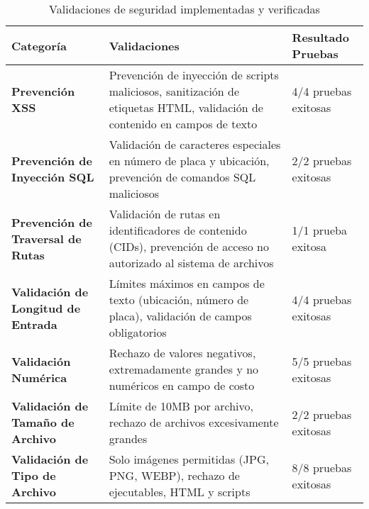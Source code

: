 \begin{table}[htbp]
\centering
\caption{Validaciones de seguridad implementadas y verificadas}
\begin{adjustbox}{max width=\textwidth}
\begin{tabular}{@{}lp{6cm}p{5cm}@{}}
\toprule
\textbf{Categoría} & \textbf{Validaciones} & \textbf{Resultado Pruebas} \\
\midrule

\textbf{Prevención XSS} &
Prevención de inyección de scripts maliciosos, sanitización de etiquetas HTML, validación de contenido en campos de texto &
4/4 pruebas exitosas \\
\addlinespace

\textbf{Prevención de Inyección SQL} &
Validación de caracteres especiales en número de placa y ubicación, prevención de comandos SQL maliciosos &
2/2 pruebas exitosas \\
\addlinespace

\textbf{Prevención de Traversal de Rutas} &
Validación de rutas en identificadores de contenido (CIDs), prevención de acceso no autorizado al sistema de archivos &
1/1 prueba exitosa \\
\addlinespace

\textbf{Validación de Longitud de Entrada} &
Límites máximos en campos de texto (ubicación, número de placa), validación de campos obligatorios &
4/4 pruebas exitosas \\
\addlinespace

\textbf{Validación Numérica} &
Rechazo de valores negativos, extremadamente grandes y no numéricos en campo de costo &
5/5 pruebas exitosas \\
\addlinespace

\textbf{Validación de Tamaño de Archivo} &
Límite de 10MB por archivo, rechazo de archivos excesivamente grandes &
2/2 pruebas exitosas \\
\addlinespace

\textbf{Validación de Tipo de Archivo} &
Solo imágenes permitidas (JPG, PNG, WEBP), rechazo de ejecutables, HTML y scripts &
8/8 pruebas exitosas \\

\bottomrule
\end{tabular}
\end{adjustbox}
\end{table}
